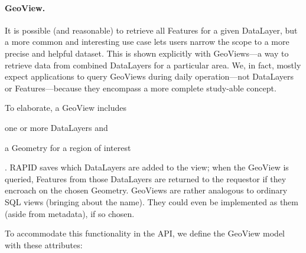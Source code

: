 \paragraph{GeoView.}
It is possible (and reasonable) to retrieve all Features for a given DataLayer, but a more common and interesting use case lets users narrow the scope to a more precise and helpful dataset. This is shown explicitly with GeoViews---a way to retrieve data from combined DataLayers for a particular area. We, in fact, mostly expect applications to query GeoViews during daily operation---not DataLayers or Features---because they encompass a more complete study-able concept.

To elaborate, a GeoView includes 
\begin{enumerate*}[label=\itshape\alph*\upshape)]
\item one or more DataLayers and
\item a Geometry for a region of interest
\end{enumerate*}. RAPID saves which DataLayers are added to the view; when the GeoView is queried, Features from those DataLayers are returned to the requestor if they encroach on the chosen Geometry. GeoViews are rather analogous to ordinary SQL views (bringing about the name). They could even be implemented as them (aside from metadata), if so chosen.

To accommodate this functionality in the API, we define the GeoView model with these attributes:

